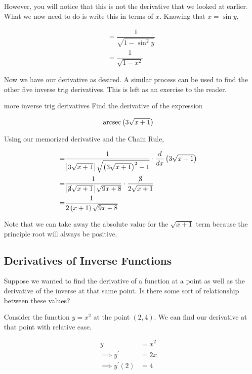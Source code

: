 However, you will notice that this is not the derivative that we looked at earlier. What we now need to do is write this in terms of \( x \). Knowing that \( x  = \sin{y} \),

\begin{align}
    &= \dfrac{1}{\sqrt{1 - \sin^2{y}}} \\
    &= \dfrac{1}{\sqrt{1 - x^2}}
\end{align}

Now we have our derivative as desired. A similar process can be used to find the other five inverse trig derivatives. This is left as an exercise to the reader.

\begin{example}{more inverse trig derivatives}
    Find the derivative of the expression
    
    \[ \operatorname{arcsec}{\left( 3 \sqrt{x + 1} \right)} \]
    
    Using our memorized derivative and the Chain Rule,
    
    \begin{align}
        = &\dfrac{1}{\left\lvert {3 \sqrt{x + 1}} \right\rvert \sqrt{\left( 3 \sqrt{x + 1} \right)^2 - 1}} \cdot \dfrac{d}{dx} \left( 3 \sqrt{x + 1} \right) \\
        = &\dfrac{1}{\left\lvert {\cancel{3}\sqrt{x + 1}} \right\rvert \sqrt{9x + 8}} \cdot \dfrac{\cancel{3}}{2\sqrt{x + 1}} \\
        = &\dfrac{1}{2 \left( x + 1 \right) \sqrt{9x + 8}}
    \end{align}
    
    Note that we can take away the absolute value for the \( \sqrt{x + 1} \) term because the principle root will always be positive.
\end{example}

\subsection{Derivatives of Inverse Functions}

Suppose we wanted to find the derivative of a function at a point as well as the derivative of the inverse at that same point. Is there some sort of relationship between these values?

Consider the function \( y = x^2 \) at the point \( \left( 2, 4 \right) \). We can find our derivative at that point with relative ease.

\begin{align}
    y &= x^2 \\
    \implies y^\prime &= 2x \\
    \implies y^\prime \left( 2 \right) &= 4
\end{align}

